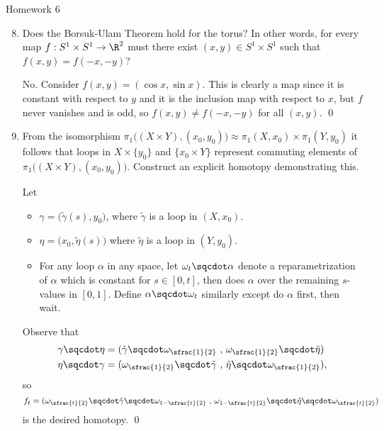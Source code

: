 \documentclass[12pt,letterpaper]{article}
\begin{document}
\pagestyle{fancy}
\begin{center}
{\Large Homework 6}%
\end{center}

\begin{enumerate}

\setcounter{enumi}{7}
\item Does the Borsuk-Ulam Theorem hold for the torus? In other words, for every map $f:S^1\times S^1\to \R^2$ must there exist $(x,y)\in S^1\times S^1$ such that $f(x,y)=f(-x,-y)$?

\answer No. Consider $f(x,y)=(\cos x, \sin x)$. This is clearly a map since it is constant with respect to $y$ and it is the inclusion map with respect to $x$, but $f$ never vanishes and is odd, so $f(x,y)\neq f(-x,-y)$ for all $(x,y)$. \qed

\setcounter{enumi}{9}
\item From the isomorphism $\pi_1\big((X\times Y),(x_0,y_0)\big)\approx \pi_1(X,x_0)\times \pi_1(Y,y_0)$ it follows that loops in $X\times	\{y_0\}$ and $\{x_0\times Y\}$ represent commuting elements of $\pi_1\big((X\times Y),(x_0,y_0)\big)$. Construct an explicit homotopy demonstrating this. 

\answer Let 
\begin{itemize}
\item $\gamma=\big(\tilde{\gamma}(s),y_0\big)$, where $\tilde{\gamma}$ is a loop in $(X,x_0)$. 
\item $\eta=\big(x_0,\tilde{\eta}(s)\big)$ where $\tilde{\eta}$ is a loop in $(Y,y_0)$. 
\item For any loop $\alpha$ in any space, let $\omega_t\sqcdot\alpha$ denote a reparametrization of $\alpha$ which is constant for $s\in [0,t]$, then does $\alpha$ over the remaining $s$-values in $[0,1]$. Define $\alpha\sqcdot\omega_t$ similarly except do $\alpha$ first, then wait. 
\end{itemize}
Observe that 
\begin{align*}
\gamma\sqcdot\eta&=(\tilde{\gamma}\sqcdot\omega_{\sfrac{1}{2}}\,\,,\, \omega_{\sfrac{1}{2}}\sqcdot\tilde{\eta})\\
\eta\sqcdot\gamma&=(\omega_{\sfrac{1}{2}}\sqcdot\tilde{\gamma}\,\,,\, \tilde{\eta}\sqcdot\omega_{\sfrac{1}{2}}),
\end{align*}
so 
$$f_t=(\omega_{\sfrac{t}{2}}\sqcdot\tilde{\gamma}\sqcdot\omega_{1-\sfrac{t}{2}}\,\,,\, \omega_{1-\sfrac{t}{2}}\sqcdot\tilde{\eta}\sqcdot\omega_{\sfrac{t}{2}})$$
is the desired homotopy. \qed

\end{enumerate}
\end{document}
